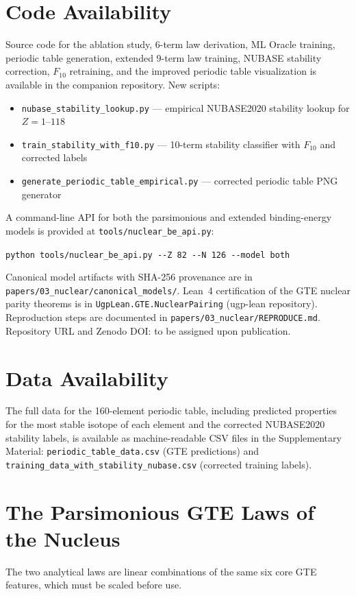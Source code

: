 \documentclass[9pt,twocolumn]{extarticle}
\begin{document}
\section*{Code Availability}
Source code for the ablation study, 6-term law derivation, ML Oracle training, periodic table generation, extended 9-term law training, NUBASE stability correction, $F_{10}$ retraining, and the improved periodic table visualization is available in the companion repository. New scripts:
\begin{itemize}[nosep]
\item \texttt{nubase\_stability\_lookup.py} --- empirical NUBASE2020 stability lookup for $Z=1$--$118$
\item \texttt{train\_stability\_with\_f10.py} --- 10-term stability classifier with $F_{10}$ and corrected labels
\item \texttt{generate\_periodic\_table\_empirical.py} --- corrected periodic table PNG generator
\end{itemize}
A command-line API for both the parsimonious and extended binding-energy models is provided at \texttt{tools/nuclear\_be\_api.py}:
\begin{center}
\texttt{python tools/nuclear\_be\_api.py -{}-Z 82 -{}-N 126 -{}-model both}
\end{center}
Canonical model artifacts with SHA-256 provenance are in \texttt{papers/03\_nuclear/canonical\_models/}.
Lean~4 certification of the GTE nuclear parity theorems is in \texttt{UgpLean.GTE.NuclearPairing} (ugp-lean repository).
Reproduction steps are documented in \texttt{papers/03\_nuclear/REPRODUCE.md}.
Repository URL and Zenodo DOI: to be assigned upon publication.

\section*{Data Availability}
The full data for the 160-element periodic table, including predicted properties for the most stable isotope of each element and the corrected NUBASE2020 stability labels, is available as machine-readable CSV files in the Supplementary Material: \texttt{periodic\_table\_data.csv} (GTE predictions) and \texttt{training\_data\_with\_stability\_nubase.csv} (corrected training labels).


\clearpage
\appendix
\onecolumn %
\section{The Parsimonious GTE Laws of the Nucleus}
The two analytical laws are linear combinations of the same six core GTE features, which must be scaled before use.
\end{document}
